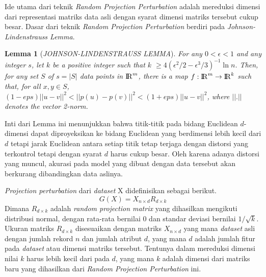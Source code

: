 Ide utama dari teknik \textit{Random Projection Perturbation} adalah mereduksi dimensi dari representasi matriks data asli dengan syarat dimensi matriks tersebut cukup besar. Dasar dari teknik \textit{Random Projection Perturbation} berdiri pada \textit{Johnson-Lindenstrauss Lemma}.~\cite{lindestrauss:84:jllemma}
\newtheorem{theorem}{Lemma}
\begin{theorem}[\textit{JOHNSON-LINDENSTRAUSS LEMMA}]
	For any \(0 < \epsilon < 1\) and any integer \(s\), let \(k\) be a positive integer such that \(k\) \(\geq 4(\epsilon^{2}/2-\epsilon^{3}/3)^{-1}\ln{n}\). Then, for any set \(S\) of \(s = |S|\) data points in \({\rm I\!R}^{m}\), there is a map \(f : {\rm I\!R}^{m} \rightarrow {\rm I\!R}^{k}\) such that, for all \(x, y \in S\), \((1-eps)||u - v||^{2}<||p(u) - p(v)||^{2}<(1+eps)||u - v||^{2}\), where \(||.||\) denotes the vector 2-norm.
\end{theorem}
Inti dari Lemma ini menunjukkan bahwa titik-titik pada bidang Euclidean \(d\)-dimensi dapat diproyeksikan ke bidang Euclidean yang berdimensi lebih kecil dari \(d\) tetapi jarak Euclidean antara setiap titik tetap terjaga dengan distorsi yang terkontrol tetapi dengan syarat \(d\) harus cukup besar. Oleh karena adanya distorsi yang muncul, akurasi pada model yang dibuat dengan data tersebut akan berkurang dibandingkan data aslinya.~\cite{kargupta:06:projection}

\textit{Projection perturbation} dari \textit{dataset} X didefinisikan sebagai berikut.
\begin{equation}
	G(X) = X_{n \times d} R_{d \times k}
\end{equation}
Dimana \(R_{d \times k}\) adalah \textit{random projection matrix} yang dihasilkan mengikuti distribusi normal, dengan rata-rata bernilai 0 dan standar deviasi bernilai \(1/\sqrt{k}\). Ukuran matriks \(R_{d \times k}\) disesuaikan dengan matriks \(X_{n \times d}\) yang mana \textit{dataset} asli dengan jumlah rekord \(n\) dan jumlah atribut \(d\), yang mana \(d\) adalah jumlah fitur pada \textit{dataset} atau dimensi matriks tersebut. Tentunya dalam mereduksi dimensi nilai \(k\) harus lebih kecil dari pada \(d\), yang mana \(k\) adalah dimensi dari matriks baru yang dihasilkan dari \textit{Random Projection Perturbation} ini.

